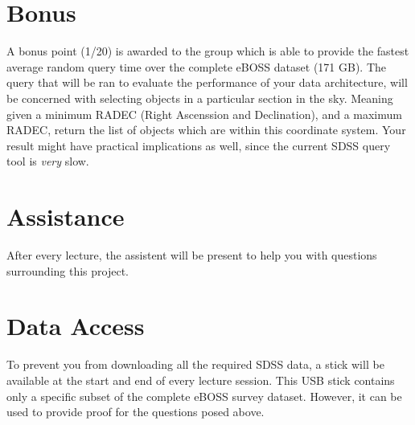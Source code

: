 \section{Bonus}
\label{sec:bonus}

A bonus point (1/20) is awarded to the group which is able to provide the fastest average random query time over the complete eBOSS dataset (171 GB). The query that will be ran to evaluate the performance of your data architecture, will be concerned with selecting objects in a particular section in the sky. Meaning given a minimum RADEC (Right Ascenssion and Declination), and a maximum RADEC, return the list of objects which are within this coordinate system. Your result might have practical implications as well, since the current SDSS query tool is \emph{very} slow.

\section{Assistance}
\label{sec:assistance}

After every lecture, the assistent will be present to help you with questions surrounding this project.

\section{Data Access}
\label{sec:data_access}

To prevent you from downloading all the required SDSS data, a stick will be available at the start and end of every lecture session. This USB stick contains only a specific subset of the complete eBOSS survey dataset. However, it can be used to provide proof for the questions posed above.


